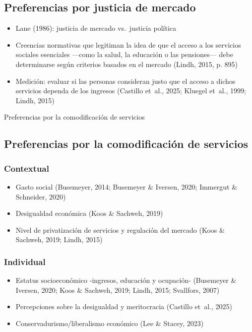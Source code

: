 \documentclass[
  spanish,
  letterpaper,
  DIV=11,
  numbers=noendperiod,
  oneside]{scrartcl}
\providecommand{\tightlist}{%
  \setlength{\itemsep}{0pt}\setlength{\parskip}{0pt}}
\begin{document}
\subsection{Preferencias por justicia de
mercado}\label{preferencias-por-justicia-de-mercado}

\begin{itemize}
\item
  Lane (1986): justicia de mercado vs.~justicia política
\item
  Creencias normativas que legitiman la idea de que el acceso a los
  servicios sociales esenciales ---como la salud, la educación o las
  pensiones--- debe determinarse según criterios basados en el mercado
  (Lindh, 2015, p. 895)
\item
  Medición: evaluar si las personas consideran justo que el acceso a
  dichos servicios dependa de los ingresos (Castillo et~al., 2025;
  Kluegel et~al., 1999; Lindh, 2015)
\end{itemize}

Preferencias por la comodificación de servicios

\subsection{Preferencias por la comodificación de
servicios}\label{preferencias-por-la-comodificaciuxf3n-de-servicios}

\subsubsection{Contextual}\label{contextual}

\begin{itemize}
\tightlist
\item
  Gasto social (Busemeyer, 2014; Busemeyer \& Iversen, 2020; Immergut \&
  Schneider, 2020)
\item
  Desigualdad económica (Koos \& Sachweh, 2019)
\item
  Nivel de privatización de servicios y regulación del mercado (Koos \&
  Sachweh, 2019; Lindh, 2015)
\end{itemize}

\subsubsection{Individual}\label{individual}

\begin{itemize}
\tightlist
\item
  Estatus socioeconómico -ingresos, educación y ocupación- (Busemeyer \&
  Iversen, 2020; Koos \& Sachweh, 2019; Lindh, 2015; Svallfors, 2007)
\item
  Percepciones sobre la desigualdad y meritocracia (Castillo et~al.,
  2025)
\item
  Conservadurismo/liberalismo económico (Lee \& Stacey, 2023)
\end{itemize}
\end{document}
